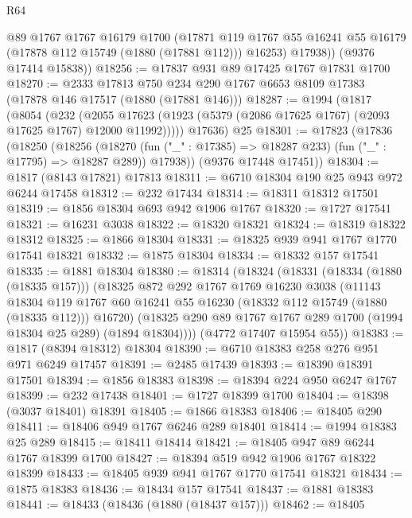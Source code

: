\begin{lexlean}{R64}
\begin{coremodule}
          @89
          @1767
          @1767
          @16179
          @1700
          (@17871
            @119
            @1767
            @55
            @16241
            @55
            @16179
            (@17878 @112 @15749 (@1880 (@17881 @112)))
            @16253)
          @17938))
      (@9376 @17414 @15838))
@18256 := @17837 @931 @89 @17425 @1767 @17831 @1700
@18270 := @2333
    @17813
    @750
    @234
    @290
    @1767
    @6653
    @8109
    @17383
    (@17878 @146 @17517 (@1880 (@17881 @146)))
@18287 := @1994
    (@1817
      (@8054
        (@232
          (@2055 @17623 (@1923 (@5379 (@2086 @17625 @1767) (@2093 @17625 @1767) @12000 @11992)))))
      @17636)
    @25
@18301 := @17823
    (@17836
      (@18250
        (@18256
          (@18270 (fun ("_" : @17385) => @18287 @233) (fun ("_" : @17795) => @18287 @289))
          @17938))
      (@9376 @17448 @17451))
@18304 := @1817 (@8143 @17821) @17813
@18311 := @6710 @18304 @190 @25 @943 @972 @6244 @17458
@18312 := @232 @17434
@18314 := @18311 @18312 @17501
@18319 := @1856 @18304 @693 @942 @1906 @1767
@18320 := @1727 @17541
@18321 := @16231 @3038
@18322 := @18320 @18321
@18324 := @18319 @18322 @18312
@18325 := @1866 @18304
@18331 := @18325 @939 @941 @1767 @1770 @17541 @18321
@18332 := @1875 @18304
@18334 := @18332 @157 @17541
@18335 := @1881 @18304
@18380 := @18314
    (@18324
      (@18331
        (@18334 (@1880 (@18335 @157)))
        (@18325
          @872
          @292
          @1767
          @1769
          @16230
          @3038
          (@11143
            @18304
            @119
            @1767
            @60
            @16241
            @55
            @16230
            (@18332 @112 @15749 (@1880 (@18335 @112)))
            @16720)
          (@18325 @290 @89 @1767 @1767 @289 @1700 (@1994 @18304 @25 @289) (@1894 @18304))))
      (@4772 @17407 @15954 @55))
@18383 := @1817 (@8394 @18312) @18304
@18390 := @6710 @18383 @258 @276 @951 @971 @6249 @17457
@18391 := @2485 @17439
@18393 := @18390 @18391 @17501
@18394 := @1856 @18383
@18398 := @18394 @224 @950 @6247 @1767
@18399 := @232 @17438
@18401 := @1727 @18399 @1700
@18404 := @18398 (@3037 @18401) @18391
@18405 := @1866 @18383
@18406 := @18405 @290
@18411 := @18406 @949 @1767 @6246 @289 @18401
@18414 := @1994 @18383 @25 @289
@18415 := @18411 @18414
@18421 := @18405 @947 @89 @6244 @1767 @18399 @1700
@18427 := @18394 @519 @942 @1906 @1767 @18322 @18399
@18433 := @18405 @939 @941 @1767 @1770 @17541 @18321
@18434 := @1875 @18383
@18436 := @18434 @157 @17541
@18437 := @1881 @18383
@18441 := @18433 (@18436 (@1880 (@18437 @157)))
@18462 := @18405

\end{coremodule}
\end{lexlean}

